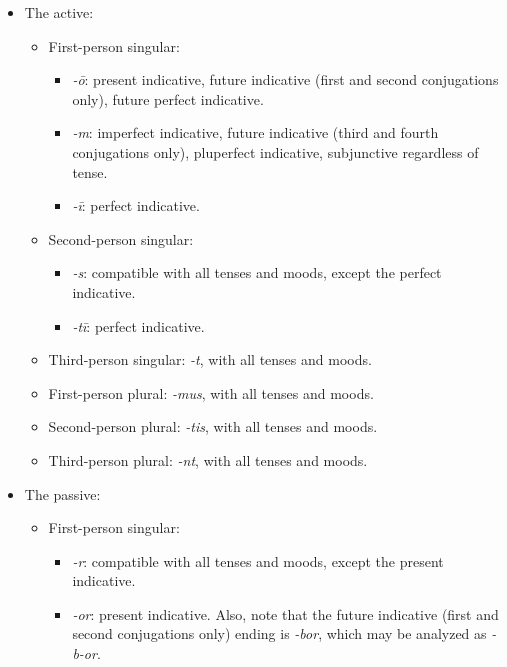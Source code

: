 \documentclass[a4paper, oneside]{report}
\newcommand{\corpus}[1]{\emph{#1}}
\begin{document}
\begin{itemize}
    \item The active:
    \begin{itemize}
        \item First-person singular: 
        \begin{itemize}
            \item \corpus{-\={o}}: present indicative, 
            future indicative (first and second conjugations only), 
            future perfect indicative.
            \item \corpus{-m}: imperfect indicative, 
            future indicative (third and fourth conjugations only),
            pluperfect indicative,
            subjunctive regardless of tense.
            \item \corpus{-ī}: perfect indicative.
        \end{itemize}
        \item Second-person singular:
        \begin{itemize}
            \item \corpus{-s}: compatible with all tenses and moods, except the perfect indicative.
            \item \corpus{-tī}: perfect indicative.
        \end{itemize}
        \item Third-person singular: \corpus{-t}, with all tenses and moods.
        \item First-person plural: \corpus{-mus}, with all tenses and moods.
        \item Second-person plural: \corpus{-tis}, with all tenses and moods.
        \item Third-person plural: \corpus{-nt}, with all tenses and moods.
    \end{itemize}
    \item The passive:
    \begin{itemize}
        \item First-person singular: 
        \begin{itemize}
            \item \corpus{-r}: compatible with all tenses and moods, except the present indicative.
            \item \corpus{-or}: present indicative.
            Also, note that the future indicative (first and second conjugations only) ending is \corpus{-bor},
            which may be analyzed as \corpus{-b-or}.
        \end{itemize}

\end{itemize}
\end{itemize}
\end{document}
